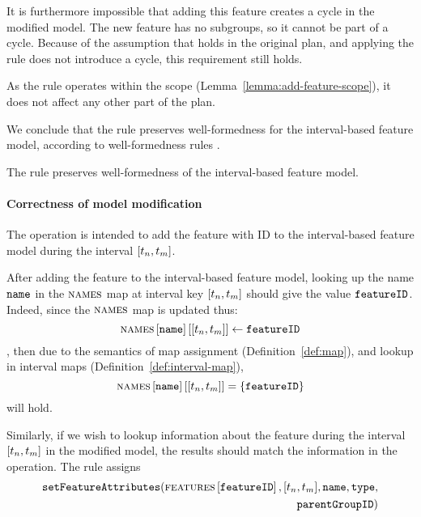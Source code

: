 It is furthermore impossible that adding this feature creates a cycle in the modified model. The new feature has no subgroups, so it cannot be part of a cycle. Because of the assumption that  holds in the original plan, and applying the rule does not introduce a cycle, this requirement still holds. 

As the rule operates within the scope (Lemma~\vref{lemma:add-feature-scope}), it does not affect any other part of the plan.

We conclude that the  rule preserves well-formedness for the interval-based feature model, according to well-formedness rules . 
\\
\begin{lemma}
   The  rule preserves well-formedness of the interval-based feature model.
   \label{lemma:add-feature-well-formed}
\end{lemma}

\paragraph{Correctness of model modification}

The operation is intended to add the feature with ID  to the interval-based feature model during the interval $\interval{t_n}{t_m}$. 

After adding the feature to the interval-based feature model, looking up the name $\texttt{name}$ in the $\textsc{names}{}$ map at interval key $\interval{t_n}{t_m}$ should give the value $\texttt{featureID}$. Indeed, since the $\textsc{names}{}$ map is updated thus:
\[
   \lookup{\lookup{\names}{\var{name}}}{\interval{t_n}{t_m}} \assign \var{featureID}
\]
, then due to the semantics of map assignment (Definition~\vref{def:map}), and lookup in interval maps (Definition~\vref{def:interval-map}),
\[
   \lookup{\lookup{\names}{\var{name}}}{\interval{t_n}{t_m}} = \set{\var{featureID}}
\]
will hold.

Similarly, if we wish to lookup information about the feature during the interval $\interval{t_n}{t_m}$ in the modified model, the results should match the information in the operation. The rule assigns 
\begin{equation*}
   \begin{split}
   \var{setFeatureAttributes}(\lookup{\features{}}{\var{featureID}}, \interval{t_n}{t_m}, \var{name}, \var{type}, \\
   \var{parentGroupID})
   \end{split}
\end{equation*}

